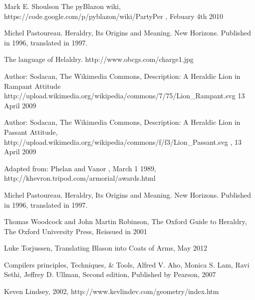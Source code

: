 \begin{thebibliography}{100}

  	Mark E. Shoulson
 	The pyBlazon wiki, 
 	https://code.google.com/p/pyblazon/wiki/PartyPer , 
 	Febuary 4th 2010


	Michel Pastoureau. 
	Heraldry, Its Origins and Meaning.
	New Horizons. 
	Published in 1996, translated in 1997.


	The language of Helaldry.
	http://www.obcgs.com/charge1.jpg

	Author: Sodacan,  
	The Wikimedia Commons,
	Description: A Heraldic Lion in Rampant Attitude
	http://upload.wikimedia.org/wikipedia/commons/7/75/Lion\_Rampant.svg
	13 April 2009

	Author: Sodacan,
	The Wikimedia Commons, 
	Description: A Heraldic Lion in Passant Attitude, 
	http://upload.wikimedia.org/wikipedia/commons/f/f3/Lion\_Passant.svg ,
	13 April 2009
	
	Adapted from: 
	Phelan and Vanor , 
	March 1 1989, 
	http://khevron.tripod.com/armorial/awards.html


	Michel Pastoureau. 
	Heraldry, Its Origins and Meaning.
	New Horizons. 
	Published in 1996, translated in 1997.


	Thomas Woodcock and John Martin Robinson, 
	The Oxford Guide to Heraldry, 
	The Oxford University Press, 
	Reissued in 2001


	Luke Torjussen, 
	Translating Blason into Coats of Arms, 
	May 2012

	Compilers principles, Techniques, \& Tools, 
	Alfred V. Aho, Monica S. Lam, Ravi Sethi, Jeffrey D. Ullman, 
	Second edition,  Published by Pearson, 
	2007 

	Keven Lindsey,
	2002,
	http://www.kevlindev.com/geometry/index.htm

\end{thebibliography}